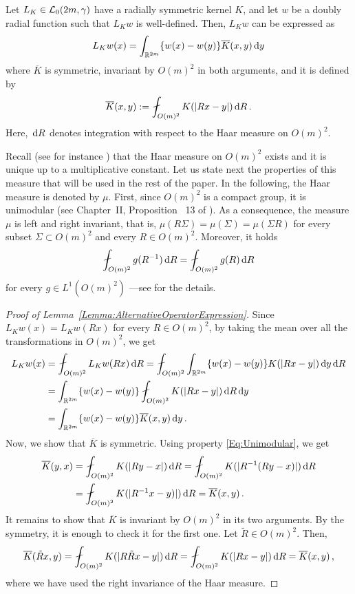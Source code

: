 \begin{lemma} \label{Lemma:AlternativeOperatorExpression}
Let $L_K \in \mathcal{L}_0(2m,\gamma)$ have a radially symmetric kernel $K$, and let $w$ be a doubly radial function such that $L_K w$ is well-defined. Then, $L_K w$ can be expressed as
$$
L_K w(x) = \int_{\mathbb{R}^{2m}} \{w(x) - w(y)\} \overline{K}(x,y) \,\mathrm{d} y
$$
where $\overline{K}$ is symmetric, invariant by $O(m)^2$ in both arguments, and it is defined by
\begin{equation*}
\overline{K}(x,y) := \average_{O(m)^2} K(|Rx - y|)\d R\,.
\end{equation*}
Here, $\,\mathrm{d} R$ denotes integration with respect to the Haar measure on $O(m)^2$.
\end{lemma}

Recall (see for instance \cite{Nachbin}) that the Haar measure on $O(m)^2$ exists and it is unique up to a
multiplicative constant. Let us state next the properties of this measure that will be used in the rest of the
paper. In the following, the Haar measure is denoted by $\mu$. First, since $O(m)^2$ is a compact
group, it is unimodular (see Chapter~II, Proposition~ 13 of \cite{Nachbin}). As a consequence, the
measure $\mu$ is left and right invariant, that is, $\mu(R\Sigma) = \mu(\Sigma) = \mu(\Sigma R) $
for every subset $\Sigma \subset O(m)^2$ and every $R\in O(m)^2$. Moreover, it holds
\begin{equation}
\label{Eq:Unimodular}
\average_{O(m)^2} g(R^{-1}) \d R = \average_{O(m)^2} g(R) \d R
\end{equation}	
for every $g\in L^1(O(m)^2)$ ---see \cite{Nachbin} for the details.

\begin{proof}[Proof of Lemma~\ref{Lemma:AlternativeOperatorExpression}]
Since $L_K w (x) = L_K w (Rx)$ for every $R\in O(m)^2$, by taking the mean over all the transformations in $O(m)^2$, we get
\begin{align*}
L_K w(x) &= \average_{O(m)^2} L_K w(Rx)\d R =  \average_{O(m)^2} \int_{\R^{2m}} \{w(x) - w(y)\}K(|Rx - y|) \d y \d R\\
&= \int_{\R^{2m}} \{w(x) - w(y)\}  \average_{O(m)^2} K(|Rx - y|) \d R  \d y \\
&= \int_{\R^{2m}} \{w(x) - w(y)\}  \overline{K}(x,y) \d y\,.
\end{align*}
Now, we show that $\overline{K}$ is symmetric. Using property \eqref{Eq:Unimodular}, we get
\begin{align*}
\overline{K}(y,x) &= \average_{O(m)^2} K(|R y - x|)\d R = \average_{O(m)^2} K(|R^{-1} (R y - x)|)\d R \\
&= \average_{O(m)^2} K(|R^{-1}x-y)|)\d R = \overline{K}(x,y)\,.
\end{align*}
It remains to show that
$\overline{K}$ is invariant by $O(m)^2$ in its two arguments. By the symmetry, it is enough to
check it for the first one. Let $\tilde{R} \in O(m)^2$. Then,
$$
\overline{K} (\tilde{R}x, y) = \average_{O(m)^2} K(|R \tilde{R} x - y|)\d R  = \average_{O(m)^2} K(|R x - y|)\d R = \overline{K} (x, y)\,,
$$
where we have used the right invariance of the Haar measure.
\end{proof}



